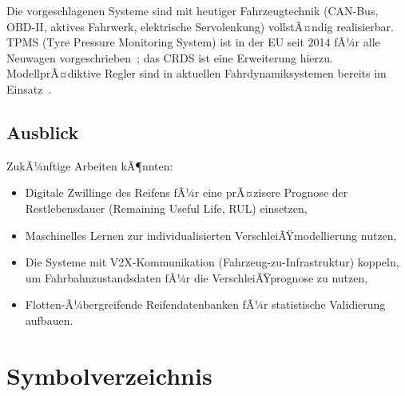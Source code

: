 ﻿\documentclass[12pt,a4paper]{article}
\theoremstyle{definition}
\theoremstyle{remark}
\begin{document}
Die vorgeschlagenen Systeme sind mit heutiger Fahrzeugtechnik (CAN-Bus,
OBD-II, aktives Fahrwerk, elektrische Servolenkung) vollstÃ¤ndig realisierbar.
TPMS (Tyre Pressure Monitoring System) ist in der EU seit 2014 fÃ¼r alle
Neuwagen vorgeschrieben~\cite{EU_TPMS2009}; das CRDS ist eine Erweiterung
hierzu. ModellprÃ¤diktive Regler sind in aktuellen Fahrdynamiksystemen
bereits im Einsatz~\cite{Falcone2007}.

\subsection{Ausblick}

ZukÃ¼nftige Arbeiten kÃ¶nnten:
\begin{itemize}
  \item Digitale Zwillinge des Reifens fÃ¼r eine prÃ¤zisere Prognose der
        Restlebensdauer (Remaining Useful Life, RUL) einsetzen,
  \item Maschinelles Lernen zur individualisierten VerschleiÃŸmodellierung nutzen,
  \item Die Systeme mit V2X-Kommunikation (Fahrzeug-zu-Infrastruktur) koppeln,
        um Fahrbahnzustandsdaten fÃ¼r die VerschleiÃŸprognose zu nutzen,
  \item Flotten-Ã¼bergreifende Reifendatenbanken fÃ¼r statistische Validierung aufbauen.
\end{itemize}

\section*{Symbolverzeichnis}
\end{document}
